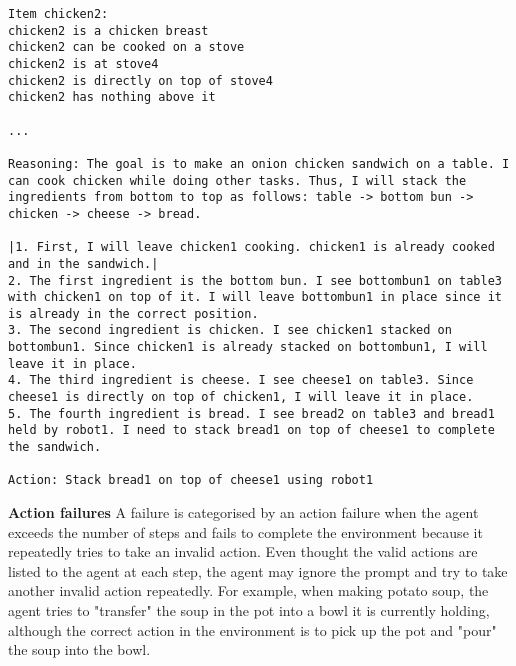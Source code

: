 \begin{lstlisting}
Item chicken2:
chicken2 is a chicken breast
chicken2 can be cooked on a stove
chicken2 is at stove4
chicken2 is directly on top of stove4
chicken2 has nothing above it

...

Reasoning: The goal is to make an onion chicken sandwich on a table. I can cook chicken while doing other tasks. Thus, I will stack the ingredients from bottom to top as follows: table -> bottom bun -> chicken -> cheese -> bread.

|1. First, I will leave chicken1 cooking. chicken1 is already cooked and in the sandwich.|
2. The first ingredient is the bottom bun. I see bottombun1 on table3 with chicken1 on top of it. I will leave bottombun1 in place since it is already in the correct position.
3. The second ingredient is chicken. I see chicken1 stacked on bottombun1. Since chicken1 is already stacked on bottombun1, I will leave it in place.
4. The third ingredient is cheese. I see cheese1 on table3. Since cheese1 is directly on top of chicken1, I will leave it in place.
5. The fourth ingredient is bread. I see bread2 on table3 and bread1 held by robot1. I need to stack bread1 on top of cheese1 to complete the sandwich.

Action: Stack bread1 on top of cheese1 using robot1
\end{lstlisting}

\textbf{Action failures} 
A failure is categorised by an action failure when the agent exceeds the number of steps and fails to complete the environment because it repeatedly tries to take an invalid action. Even thought the valid actions are listed to the agent at each step, the agent may ignore the prompt and try to take another invalid action repeatedly. For example, when making potato soup, the agent tries to "transfer" the soup in the pot into a bowl it is currently holding, although the correct action in the environment is to pick up the pot and "pour" the soup into the bowl. 


